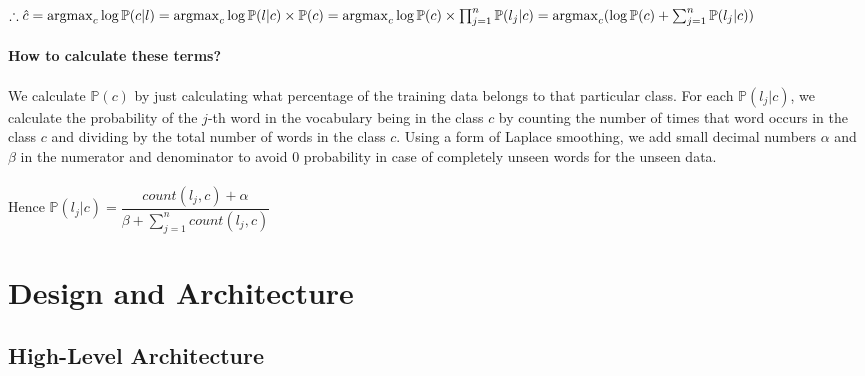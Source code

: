 \documentclass[12pt]{scrreprt}
\DeclareMathOperator*{\argmax}{argmax} %
\newcommand{\pr}{\mathbb{P}}
\begin{document}
$\therefore \hat{c} =  \argmax_c \log \pr(c | l) = \argmax_c \log \pr(l | c) \times \pr(c) = \argmax_c  \log \pr(c) \times \prod_{j=1}^{n} \mathbb{P}(l_{j} | c)  \\
\\ = \argmax_c (\log \pr(c) + \sum_{j=1}^{n} \pr(l_{j} | c)) $\\
\\ \textbf{How to calculate these terms?}\\
\\ We calculate $\pr(c)$ by just calculating what percentage of the training data belongs to that particular class. For each $\pr(l_j|c)$, we calculate the probability of the $j$-th word in the vocabulary being in the class $c$ by counting the number of times that word occurs in the class $c$ and dividing by the total number of words in the class $c$. Using a form of Laplace smoothing, we add small decimal numbers $\alpha$ and $\beta$ in the numerator and denominator to avoid 0 probability in case of completely unseen words for the unseen data.\\
\\ Hence $\pr(l_j|c) = \dfrac{count(l_j, c) + \alpha}{\beta + \sum_{j=1}^{n} count(l_j, c)}$







\chapter{Design and Architecture}





\section{High-Level Architecture}
\end{document}
